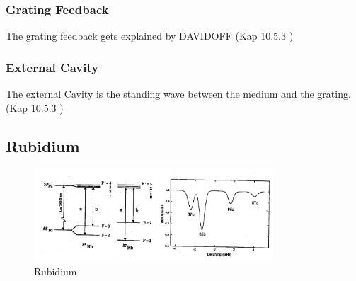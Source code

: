 \subsubsection*{Grating Feedback}
The grating feedback gets explained by DAVIDOFF (Kap 10.5.3 \cite{eichler_laser})
\subsubsection*{External Cavity}
The external Cavity is the standing wave between the medium and the grating. (Kap 10.5.3 \cite{eichler_laser})

\subsection{Rubidium}
\begin{figure}
    \center
    \includegraphics[width=0.8\textwidth]{bilder/Rubidium_Energy.png}
    \caption{Rubidium \cite{anleitung}}
    \label{fig:rubidium}
\end{figure}